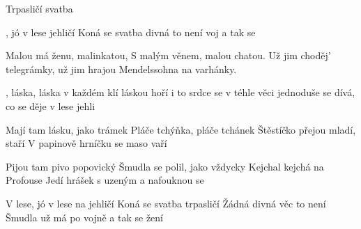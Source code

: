 \begin{TEXT}{Trpasličí svatba}

\SLOKA {}, jó v lese  jehličí \NL
Koná se svatba \NL
{} divná  to není \NL
{}   voj a tak se 
   
\SLOKA Malou má ženu, malinkatou,\NL
S malým věnem, malou chatou.\NL
Už jim choděj' telegrámky,\NL
už jim hrajou Mendelssohna na varhánky.\NL

\REFREN {} , láska, láska v každém  klí\NL
{} láskou hoří i to srdce \NL
{} se v téhle věci jednoduše \NL
{} se dívá, co se děje v lese  jehli 

\SLOKA Mají tam lásku, jako trámek\NL
Pláče tchýňka, pláče tchánek\NL
Štěstíčko přejou mladí, staří\NL
V papinově hrníčku se maso vaří

\SLOKA Pijou tam pivo popovický\NL
Šmudla se polil, jako vždycky\NL
Kejchal kejchá na Profouse\NL
Jedí hrášek s uzeným a nafouknou se

\REFRENHRAJ

\SLOKA V lese, jó v lese na jehličí\NL
Koná se svatba trpasličí\NL
Žádná divná věc to není\NL
Šmudla už má po vojně a tak se žení
\end{TEXT}